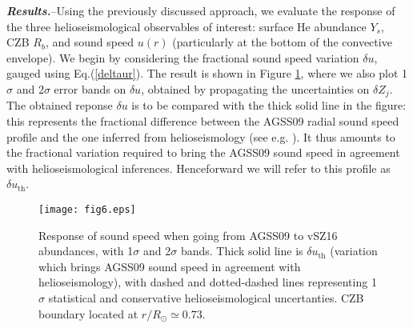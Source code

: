 \documentclass[aps,prl,twocolumn,showpacs]{revtex4}
\begin{document}
\textbf{\textit{Results.\/}}\---Using the previously discussed approach, we evaluate the response of the three helioseismological observables of interest: surface He abundance $Y_s$, CZB $R_b$, and sound speed $u(r)$ (particularly at the bottom of the convective envelope). We begin by considering the fractional sound speed variation $\delta u$, gauged using Eq.(\ref{deltaur}). The result is shown in Figure \ref{fig6}, where we also plot 1$\sigma$ and 2$\sigma$ error bands on $\delta u$, obtained by propagating the uncertainties on $\delta Z_j$. The obtained reponse $\delta u$ is to be compared with the thick solid line in the figure: this represents the fractional difference between the AGSS09 radial sound speed profile and the one inferred from helioseismology (see e.g. \cite{psq2}). It thus amounts to the fractional variation required to bring the AGSS09 sound speed in agreement with helioseismological inferences. Henceforward we will refer to this profile as $\delta u_{\text{th}}$.
\begin{figure}[!h]
\texttt{[image: fig6.eps]}
\caption{Response of sound speed when going from AGSS09 to vSZ16 abundances, with 1$\sigma$ and 2$\sigma$ bands. Thick solid line is $\delta u_{\text{th}}$ (variation which brings AGSS09 sound speed in agreement with helioseismology), with dashed and dotted-dashed lines representing 1$\sigma$ statistical and conservative helioseismological uncertanties. CZB boundary located at $r/R_{\odot} \simeq 0.73$.}
\label{fig6}
\end{figure}
\end{document}
